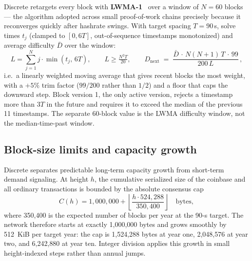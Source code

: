 \documentclass[11pt,a4paper]{article}
\begin{document}
Discrete retargets every block with \textbf{LWMA-1}~\cite{lwma} over a window
of $N = 60$ blocks --- the algorithm adopted across small proof-of-work chains
precisely because it reconverges quickly after hashrate swings. With target
spacing $T = 90$\,s, solve times $t_j$ (clamped to $[0, 6T]$, out-of-sequence
timestamps monotonized) and average difficulty $\bar{D}$ over the window:
\begin{equation}
L = \sum_{j=1}^{N} j \cdot \min(t_j,\, 6T), \qquad
L \ge \tfrac{N^2 T}{20}, \qquad
D_{\mathrm{next}} \;=\; \frac{\bar{D}\, \cdot\, N(N{+}1)\,T\, \cdot\, 99}{200\,L}\,,
\end{equation}
i.e.\ a linearly weighted moving average that gives recent blocks the most
weight, with a $+5\%$ trim factor ($99/200$ rather than $1/2$) and a floor
that caps the downward step. Block version 1, the only active version, rejects a
timestamp more than $3T$ in the future and requires it to exceed the median of
the previous 11 timestamps. The separate 60-block value is the LWMA difficulty
window, not the median-time-past window.

\subsection{Block-size limits and capacity growth}\label{sec:blocksize}

Discrete separates predictable long-term capacity growth from short-term
demand signaling. At height $h$, the cumulative serialized size of the
coinbase and all ordinary transactions is bounded by the absolute consensus
cap
\begin{equation}
C(h) = 1{,}000{,}000 +
\left\lfloor\frac{h \cdot 524{,}288}{350{,}400}\right\rfloor
\quad\text{bytes},
\label{eq:blockcap}
\end{equation}
where 350{,}400 is the expected number of blocks per year at the 90-s target.
The network therefore starts at exactly 1{,}000{,}000 bytes and grows smoothly
by 512~KiB per target year: the cap is 1{,}524{,}288 bytes at year one,
2{,}048{,}576 at year two, and 6{,}242{,}880 at year ten. Integer division
applies this growth in small height-indexed steps rather than annual jumps.
\end{document}
